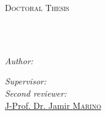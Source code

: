 \documentclass[
11pt, %
ngerman,
english, %
singlespacing, %
headsepline, %
]{MastersDoctoralThesis} %
\author{Gang \textsc{Huang}} %
\begin{document}
\frontmatter %

\pagestyle{plain} %


\begin{titlepage}
\begin{center}

\vspace*{.06\textheight}
{\scshape\LARGE \univname\par}\vspace{1.5cm} %
\textsc{\Large Doctoral Thesis}\\[0.5cm] %

\HRule \\[0.4cm] %
{\huge \bfseries \ttitle\par}\vspace{0.4cm} %
\HRule \\[1.5cm] %
 
\begin{minipage}[t]{0.4\textwidth}
\begin{flushleft} \large
\emph{Author:}\\
\href{https://hg08.github.io}{\authorname} %
\end{flushleft}
\end{minipage}
\begin{minipage}[t]{0.5\textwidth}
\begin{flushright} \large
\emph{Supervisor:} \\
\href{https://www.staff.uni-mainz.de/sulpizi}{\supname} %
\emph{Second reviewer:}\\
\href{https://sites.google.com/site/jamirmarino/home}{J-Prof. Dr. Jamir \textsc{Marino}}\\
\end{flushright}
\end{minipage}\\[3cm]
 

\end{center}
\end{titlepage}
\end{document}
